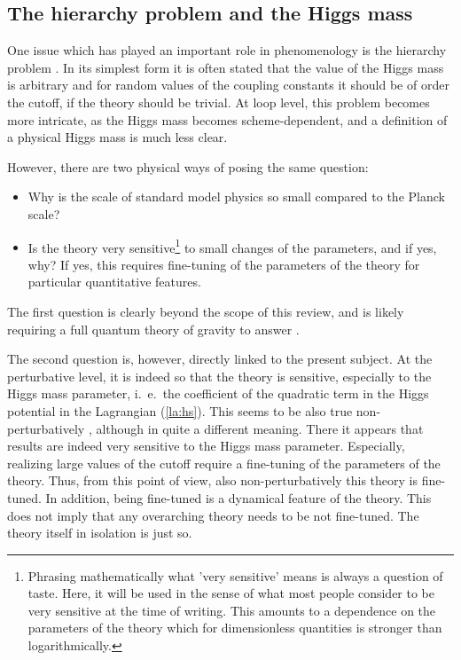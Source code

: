 \documentclass[final,12pt,3p,longtitle]{elsarticle}
\newcommand*{\pref}[1]{(\ref{#1})}
\newcommand*{\1}{1\!\!\!\bot}
\begin{document}
\subsection{The hierarchy problem and the Higgs mass}\label{ss:hierarchy}

One issue which has played an important role in phenomenology is the hierarchy problem \cite{Feng:2013pwa,Morrissey:2009tf}. In its simplest form it is often stated that the value of the Higgs mass is arbitrary and for random values of the coupling constants it should be of order the cutoff, if the theory should be trivial. At loop level, this problem becomes more intricate, as the Higgs mass becomes scheme-dependent, and a definition of a physical Higgs mass is much less clear.

However, there are two physical ways of posing the same question:
\begin{itemize}
 \item Why is the scale of standard model physics so small compared to the Planck scale?
 \item Is the theory very sensitive\footnote{Phrasing mathematically what 'very sensitive' means is always a question of taste. Here, it will be used in the sense of what most people consider to be very sensitive at the time of writing. This amounts to a dependence on the parameters of the theory which for dimensionless quantities is stronger than logarithmically.} to small changes of the parameters, and if yes, why? If yes, this requires fine-tuning of the parameters of the theory for particular quantitative features.
\end{itemize}
The first question is clearly beyond the scope of this review, and is likely requiring a full quantum theory of gravity to answer \cite{Shaposhnikov:2009pv,Dona:2013qba,Eichhorn:2016esv,Litim:2011qf}.

The second question is, however, directly linked to the present subject. At the perturbative level, it is indeed so \cite{Feng:2013pwa,Callaway:1988ya,Morrissey:2009tf} that the theory is sensitive, especially to the Higgs mass parameter, i.\ e.\ the coefficient of the quadratic term in the Higgs potential in the Lagrangian \pref{la:hs}. This seems to be also true non-perturbatively \cite{Maas:2014pba,Gies:2015lia,Gies:2016kkk}, although in quite a different meaning. There it appears that results are indeed very sensitive to the Higgs mass parameter. Especially, realizing large values of the cutoff require a fine-tuning of the parameters of the theory. Thus, from this point of view, also non-perturbatively this theory is fine-tuned. In addition, being fine-tuned is a dynamical feature of the theory. This does not imply that any overarching theory needs to be not fine-tuned. The theory itself in isolation is just so.
\end{document}
